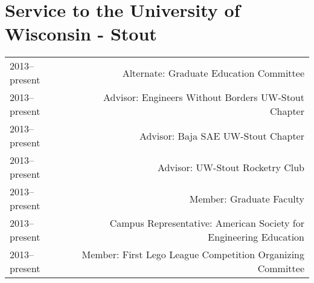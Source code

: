 \section*{Service to the University of Wisconsin - Stout}
\begin{tabular}{L!{\VRule}R}
2013--present&Alternate: Graduate Education Committee \\
2013--present&Advisor: Engineers Without Borders UW-Stout Chapter \\
2013--present&Advisor: Baja SAE UW-Stout Chapter \\
2013--present&Advisor: UW-Stout Rocketry Club\\
2013--present&Member: Graduate Faculty \\
2013--present&Campus Representative: American Society for Engineering Education\\
2013--present&Member: First Lego League Competition Organizing Committee\\
\end{tabular}
